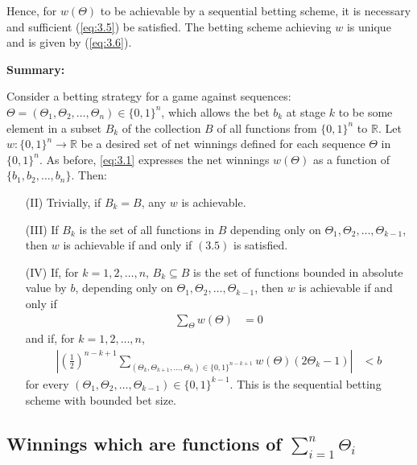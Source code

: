 \documentclass[11pt]{article}
\numberwithin{equation}{section}
\theoremstyle{boldStyle}
\begin{document}
Hence, for $w(\Theta)$ to be achievable by a sequential betting scheme, it is necessary and sufficient (\ref{eq:3.5}) be satisfied.
The betting scheme achieving \(w\) is unique and is given by (\ref{eq:3.6}).

\bigbreak

\textbf{Summary:}

Consider a betting strategy for a game against sequences: $\Theta = (\Theta_1, \Theta_2, \ldots, \Theta_n) \in \{0,1\}^n$, which allows the bet $b_k$ at stage $k$ to be some 
element in a subset $B_k$ of the collection $B$ of all functions from $\{0,1\}^n$ to $\mathbb{R}$. 
Let $w: \{0,1\}^n \rightarrow \mathbb{R}$ be a desired set of net winnings defined for each sequence $\Theta$ in $\{0,1\}^n$. 
As before, \ref{eq:3.1} expresses the net winnings $w(\Theta)$ as a function of $\{b_1, b_2, \ldots, b_n\}$. Then:

\begin{enumerate}
    \item[(II)] Trivially, if $B_k = B$, any $w$ is achievable.
    \item[(III)] If $B_k$ is the set of all functions in $B$ depending only on $\Theta_1, \Theta_2, \ldots, \Theta_{k-1}$, then $w$ is achievable if and only if $(3.5)$ is satisfied.
    \item[(IV)] If, for $k = 1, 2, \ldots, n$, $B_k \subseteq B$ is the set of functions bounded in absolute value by $b$, depending only on $\Theta_1, \Theta_2, \ldots, \Theta_{k-1}$, 
    then $w$ is achievable if and only if
    \begin{align}
        \sum_{\Theta} w(\Theta) &= 0 
    \end{align}
    and if, for $k = 1, 2, \ldots, n$,
    \begin{align}
        \left|\left(\frac{1}{2}\right)^{n-k+1} \sum_{(\Theta_k, \Theta_{k+1}, \ldots, \Theta_n) \in \{0,1\}^{n-k+1}} w(\Theta)(2\Theta_k - 1)\right| &< b 
    \end{align}
    for every $(\Theta_1, \Theta_2, \ldots, \Theta_{k-1}) \in \{0, 1\}^{k-1}$. This is the sequential betting scheme with bounded bet size.
\end{enumerate}


\subsection{Winnings which are functions of $\sum_{i=1}^{n} \Theta_i$}
\end{document}
